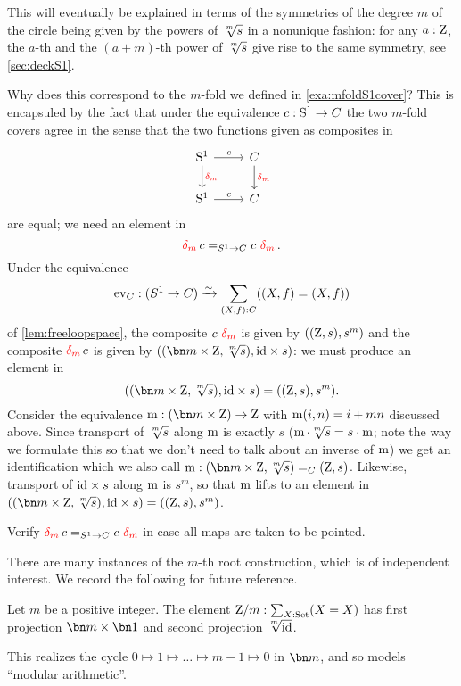 \begin{example}
This will eventually be explained in terms of the symmetries of the 
degree $m$ \covering of the circle being given by the powers of $\sqrt[\uproot{2}m]s$ in a
nonunique fashion: for any $a:\mathrm{Z}$, the $a$-th and the $(a+m)$-th power of 
$\sqrt[\uproot{2}m]s$ give rise to the same symmetry, see \cref{sec:deckS1}.

Why does this correspond to the $m$-fold \covering we defined in \cref{exa:mfoldS1cover}?  
This is encapsuled by the fact that under the equivalence $c:{\mathrm{S}^1}\to C$ the two $m$-fold covers agree in the sense that the two functions given as composites in
\[
  \begin{tikzcd}
    \Sc\ar[r,"c"]\ar[d,"\dg{m}"] & C\ar[d,"\dg{m}"] \\
    \Sc\ar[r,"c"] & C
  \end{tikzcd}
\]
are equal; we need an element in
\[
  \dg{m}c=_{S^1\to C}c\,\dg{m}.
\]
Under the equivalence 
\[
  \ev_C:(S^1\to C)\we \sum_{(X,f):C}((X,f)=(X,f))
\]
of \cref{lem:freeloopspace},
the composite $c\,\dg{m}$ is given by $((\mathrm{Z},s),s^m)$
and the composite $\dg{m}c$ is given by
$((\bn m\times\zet,\sqrt[\uproot{2}m]s),\id\times s)$: we must produce an element in
\[
  ((\bn m\times\zet,\sqrt[\uproot{2}m]s),\id\times s)=((\zet,s),s^m).
\]
Consider the equivalence  $\mZ: (\bn m\times \zet)\to\zet$ with $\mZ(i,n)=i+mn$ discussed above.  Since transport of $\sqrt[\uproot{2}m]s$ along $\mZ$ is exactly $s$ (\ie $\mZ\cdot\sqrt[\uproot{2}m]s=s\cdot\mZ$;
note the way we formulate this so that we don't need to talk about an inverse of $\mZ$) we get an identification which we also call $\mZ:(\bn m\times\zet,\sqrt[\uproot{2}m]s)=_C(\zet,s)$.  Likewise, transport of $\mathord{\mathrm{id}}\times s$ along $\mZ$ is $s^m$, so that $\mZ$ lifts to an element in
$((\bn m\times\zet,\sqrt[\uproot{2}m]s),\id\times s)=((\zet,s),s^m)$.
\end{example}

\begin{xca}\label{xca:pointed-maps-circle}
Verify $\dg{m}c=_{S^1\to C}c\,\dg{m}$ in case all maps are taken to be pointed. 
\end{xca}

There are many instances of the $m$-th root construction, which is of independent interest.  
We record the following for future reference.
\begin{definition} \label{def:Zetmodm}
Let $m$ be a positive integer.
The element $\mathrm{Z}/m:\sum_{X:\mathrm{Set}}(X=X)$ has first projection $\bn m\times\bn 1$ and 
second projection $\sqrt[\uproot{2}m]{\id}$.
\end{definition}
\noindent
This realizes the cycle $0\mapsto1\mapsto\dots\mapsto m-1\mapsto 0$ in $\bn m$, 
and so models ``modular arithmetic''.

